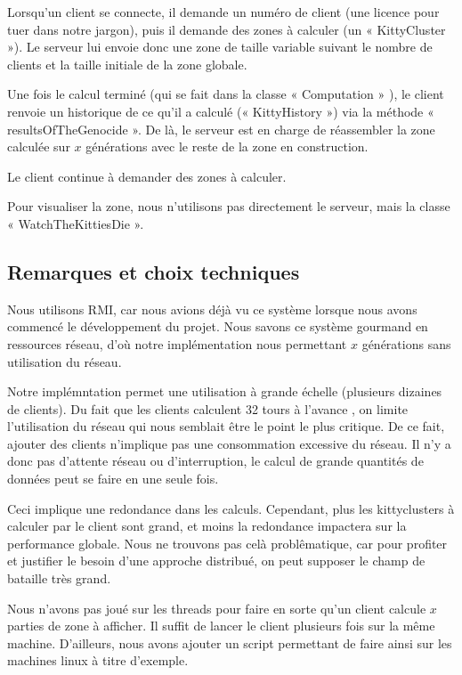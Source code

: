\documentclass[twoside]{article}
\begin{document}
Lorsqu'un client se connecte, il demande un numéro de client (une licence pour tuer dans notre jargon), puis il demande des zones à calculer (un « KittyCluster »).
Le serveur lui envoie donc une zone de taille variable suivant le nombre de clients et la taille initiale de la zone globale.

Une fois le calcul terminé (qui se fait dans la classe « Computation » ), le client renvoie un historique de ce qu'il a calculé (« KittyHistory ») via la méthode « resultsOfTheGenocide ».
De là, le serveur est en charge de réassembler la zone calculée sur $x$ générations avec le reste de la zone en construction.

Le client continue à demander des zones à calculer.

Pour visualiser la zone, nous n'utilisons pas directement le serveur, mais la classe « WatchTheKittiesDie ».

\subsection{Remarques et choix techniques}
Nous utilisons RMI, car nous avions déjà vu ce système lorsque nous avons commencé le développement du projet.
Nous savons ce système gourmand en ressources réseau, d'où notre implémentation nous permettant $x$ générations sans utilisation du réseau.

Notre implémntation permet une utilisation à grande échelle (plusieurs dizaines de clients).
Du fait que les clients calculent 32 tours à l'avance
, on limite l'utilisation du réseau qui nous semblait être le point le plus critique.
De ce fait, ajouter des clients n'implique pas une consommation excessive du réseau.
Il n'y a donc pas d'attente réseau ou d'interruption, le calcul de grande quantités de données peut se faire en une seule fois.

Ceci implique une redondance dans les calculs. Cependant, plus les kittyclusters à calculer par le client sont grand, et moins la redondance impactera sur la performance globale.
Nous ne trouvons pas celà problêmatique, car pour profiter et justifier le besoin d'une approche distribué, on peut supposer le champ de bataille très grand.

Nous n'avons pas joué sur les threads pour faire en sorte qu'un client calcule $x$ parties de zone à afficher.
Il suffit de lancer le client plusieurs fois sur la même machine.
D'ailleurs, nous avons ajouter un script permettant de faire ainsi sur les machines linux à titre d'exemple.
\end{document}

